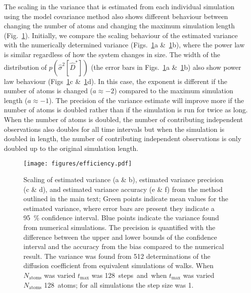 \documentclass[reprint,superscriptaddress,nobibnotes,amsmath,amssymb,aps,prx,hidelinks]{revtex4-2}
\newcommand{\prob}[1]{\ensuremath{p(#1)}}
\newcommand{\Dest}{\ensuremath{\widehat{D}^*}}
\newcommand{\varest}[1]{\ensuremath{\widehat{\sigma}^2[#1]}}
\begin{document}
The scaling in the variance that is estimated from each individual simulation using the model covariance method also shows different behaviour between changing the number of atoms and changing the maximum simulation length (Fig.~\ref{fig:efficiency}).
Initially, we compare the scaling behaviour of the estimated variance with the numerically determined variance (Figs.~\ref{fig:efficiency}a \&~\ref{fig:efficiency}b), where the power law is similar regardless of how the system changes in size. 
The width of the distribution of $\prob{\varest{\Dest}}$ (the error bars in Figs.~\ref{fig:efficiency}a \&~\ref{fig:efficiency}b) also show power law behaviour (Figs~\ref{fig:efficiency}c \&~\ref{fig:efficiency}d). 
In this case, the exponent is different if the number of atoms is changed ($a \approx -2$) compared to the maximum simulation length ($a \approx -1$). 
The precision of the variance estimate will improve more if the number of atoms is doubled rather than if the simulation is run for twice as long. 
When the number of atoms is doubled, the number of contributing independent observations also doubles for all time intervals but when the simulation is doubled in length, the number of contributing independent observations is only doubled up to the original simulation length.
%
\begin{figure}
    \centering
    \texttt{[image: figures/efficiency.pdf]}
    \caption{
        Scaling of estimated variance (a \& b), estimated variance precision (c \& d), and estimated variance accuracy (e \& f) from the method outlined in the main text;
        Green points indicate mean values for the estimated variance, where error bars are present they indicate a \SI{95}{\percent} confidence interval. 
        Blue points indicate the variance found from numerical simulations.
        The precision is quantified with the difference between the upper and lower bounds of the confidence interval and the accuracy from the bias compared to the numerical result.
        The variance was found from \num{512} determinations of the diffusion coefficient from equivalent simulations of walks. 
        When $N_{\mathrm{atoms}}$ was varied $t_{\max}$ was \SI{128} steps and when $t_{\max}$ was varied $N_{\mathrm{atoms}}$ \SI{128}{atoms}; for all simulations the step size was \num{1}.
        }
    \label{fig:efficiency}
\end{figure}
% 
\end{document}
